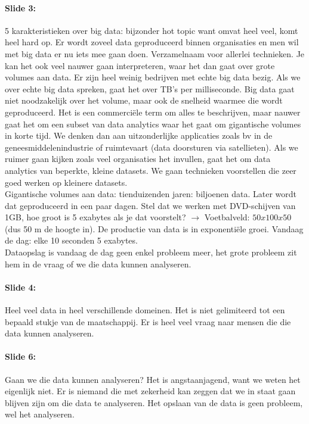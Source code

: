 \documentclass[10pt,a4paper]{report}
\begin{document}
\paragraph{Slide 3:}5 karakteristieken over big data: bijzonder hot topic want omvat heel veel, komt heel hard op. Er wordt zoveel data geproduceerd binnen organisaties en men wil met big data er nu iets mee gaan doen. Verzamelnaam voor allerlei technieken. Je kan het ook veel nauwer gaan interpreteren, waar het dan gaat over grote volumes aan data. Er zijn heel weinig bedrijven met echte big data bezig. Als we over echte big data spreken, gaat het over TB's per milliseconde. Big data gaat niet noodzakelijk over het volume, maar ook de snelheid waarmee die wordt geproduceerd. Het is een commerciële term om alles te beschrijven, maar nauwer gaat het om een subset van data analytics waar het gaat om gigantische volumes in korte tijd. We denken dan aan uitzonderlijke applicaties zoals bv in de geneesmiddelenindustrie of ruimtevaart (data doorsturen via satellieten). Als we ruimer gaan kijken zoals veel organisaties het invullen, gaat het om data analytics van beperkte, kleine datasets. We gaan technieken voorstellen die zeer goed werken op kleinere datasets.\\
Gigantische volumes aan data: tienduizenden jaren: biljoenen data. Later wordt dat geproduceerd in een paar dagen. Stel dat we werken met DVD-schijven van 1GB, hoe groot is 5 exabytes als je dat voorstelt? $\rightarrow$ Voetbalveld: $50x100x50$ (dus 50 m de hoogte in). De productie van data is in exponentiële groei. Vandaag de dag: elke 10 seconden 5 exabytes.\\
Dataopslag is vandaag de dag geen enkel probleem meer, het grote probleem zit hem in de vraag of we die data kunnen analyseren.

\paragraph{Slide 4:}Heel veel data in heel verschillende domeinen. Het is niet gelimiteerd tot een bepaald stukje van de maatschappij. Er is heel veel vraag naar mensen die die data kunnen analyseren. 

\paragraph{Slide 6:}Gaan we die data kunnen analyseren? Het is angstaanjagend, want we weten het eigenlijk niet. Er is niemand die met zekerheid kan zeggen dat we in staat gaan blijven zijn om die data te analyseren. Het opslaan van de data is geen probleem, wel het analyseren. 
\end{document}
